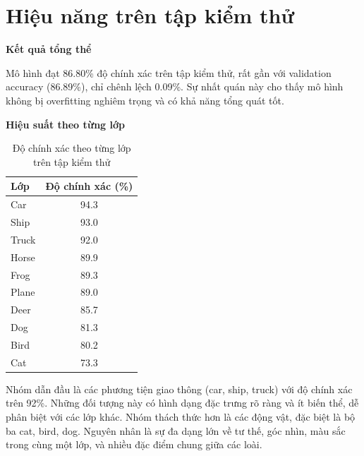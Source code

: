 \documentclass[12pt, a4paper, openany]{report}
\begin{document}
\section{Hiệu năng trên tập kiểm thử}
\textbf{Kết quả tổng thể} 

Mô hình đạt 86.80\% độ chính xác trên tập kiểm thử, rất gần với validation accuracy (86.89\%), chỉ chênh lệch 0.09\%. Sự nhất quán này cho thấy mô hình không bị overfitting nghiêm trọng và có khả năng tổng quát tốt.

\textbf{Hiệu suất theo từng lớp}
\begin{table}[H]
    \centering
    \caption{Độ chính xác theo từng lớp trên tập kiểm thử}
    \begin{tabular}{lc}
        \toprule
        \textbf{Lớp} & \textbf{Độ chính xác (\%)} \\
        \midrule
        Car & 94.3 \\
        Ship & 93.0 \\
        Truck & 92.0 \\
        Horse & 89.9 \\
        Frog & 89.3 \\
        Plane & 89.0 \\
        Deer & 85.7 \\
        Dog & 81.3 \\
        Bird & 80.2 \\
        Cat & 73.3 \\
        \bottomrule
    \end{tabular}
    \label{tab:class_accuracy}
\end{table}
Nhóm dẫn đầu là các phương tiện giao thông (car, ship, truck) với độ chính xác trên 92\%. Những đối tượng này có hình dạng đặc trưng rõ ràng và ít biến thể, dễ phân biệt với các lớp khác. Nhóm thách thức hơn là các động vật, đặc biệt là bộ ba cat, bird, dog. Nguyên nhân là sự đa dạng lớn về tư thế, góc nhìn, màu sắc trong cùng một lớp, và nhiều đặc điểm chung giữa các loài.
\end{document}
